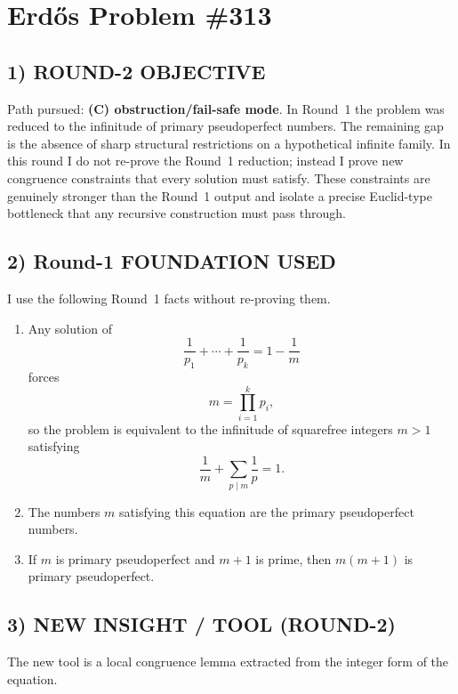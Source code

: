 \section{Erd\H{o}s Problem \#313}

\subsection*{1) ROUND-2 OBJECTIVE}
Path pursued: \textbf{(C) obstruction/fail-safe mode}.  In Round~1 the problem was reduced to the infinitude of primary pseudoperfect numbers.  The remaining gap is the absence of sharp structural restrictions on a hypothetical infinite family.  In this round I do not re-prove the Round~1 reduction; instead I prove new congruence constraints that every solution must satisfy.  These constraints are genuinely stronger than the Round~1 output and isolate a precise Euclid-type bottleneck that any recursive construction must pass through.

\subsection*{2) Round-1 FOUNDATION USED}
I use the following Round~1 facts without re-proving them.
\begin{enumerate}
\item Any solution of
\[
\frac1{p_1}+\cdots+\frac1{p_k}=1-\frac1m
\]
forces
\[
 m=\prod_{i=1}^k p_i,
\]
so the problem is equivalent to the infinitude of squarefree integers $m>1$ satisfying
\[
\frac1m+\sum_{p\mid m}\frac1p=1.
\]
\item The numbers $m$ satisfying this equation are the primary pseudoperfect numbers.
\item If $m$ is primary pseudoperfect and $m+1$ is prime, then $m(m+1)$ is primary pseudoperfect.
\end{enumerate}

\subsection*{3) NEW INSIGHT / TOOL (ROUND-2)}
The new tool is a local congruence lemma extracted from the integer form of the equation.


